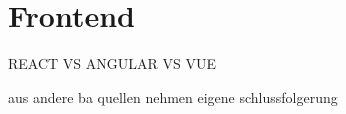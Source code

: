 \section{Frontend} \label{sec:Frontend}

REACT VS ANGULAR VS VUE

aus andere ba quellen nehmen eigene schlussfolgerung